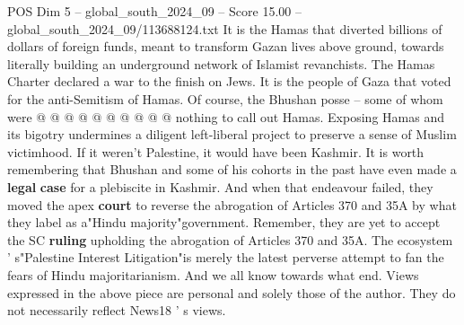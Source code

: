 \begin{textsample}{POS Dim 5 – global\_south\_2024\_09 – Score 15.00 – global\_south\_2024\_09/113688124.txt}
It is the Hamas that diverted billions of dollars of foreign funds, meant to transform Gazan lives above ground, towards literally building an underground network of Islamist revanchists.
The Hamas Charter declared a war to the finish on Jews.
It is the people of Gaza that voted for the anti-Semitism of Hamas.
Of course, the Bhushan posse -- some of whom were @ @ @ @ @ @ @ @ @ @ nothing to call out Hamas.
Exposing Hamas and its bigotry undermines a diligent left-liberal project to preserve a sense of Muslim victimhood.
If it weren't Palestine, it would have been Kashmir.
It is worth remembering that Bhushan and some of his cohorts in the past have even made a \textbf{legal} \textbf{case} for a plebiscite in Kashmir.
And when that endeavour failed, they moved the apex \textbf{court} to reverse the abrogation of Articles 370 and 35A by what they label as a"Hindu majority"government.
Remember, they are yet to accept the SC \textbf{ruling} upholding the abrogation of Articles 370 and 35A.
The ecosystem ' s"Palestine Interest Litigation"is merely the latest perverse attempt to fan the fears of Hindu majoritarianism.
And we all know towards what end.
Views expressed in the above piece are personal and solely those of the author.
They do not necessarily reflect News18 ' s views.

\end{textsample}
